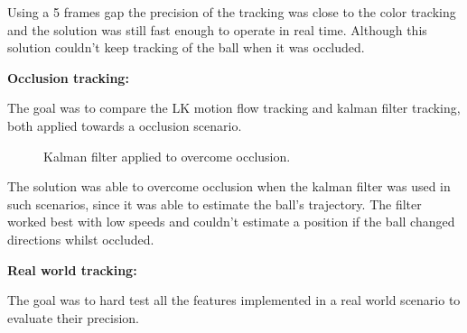 \documentclass[10pt,twocolumn,letterpaper]{article}
\begin{document}
  Using a 5 frames gap the precision of the tracking was close to the color
  tracking and the solution was still fast enough to operate in real time.
  Although this solution couldn't keep tracking of the ball when it was occluded.

  \bigbreak{}
  \textbf{Occlusion tracking:}
  \bigbreak{}

  The goal was to compare the LK motion flow tracking and kalman filter
  tracking, both applied towards a occlusion scenario.

  \begin{figure}[!h]
    \centering
    \setlength{\fboxsep}{1pt}
    \setlength{\fboxrule}{1pt}
    \caption{Kalman filter applied to overcome occlusion.}\label{fig:occlusion}
  \end{figure}

  The solution was able to overcome occlusion when the kalman filter was used in
  such scenarios, since it was able to estimate the ball's trajectory. The
  filter worked best with low speeds and couldn't estimate a position if the
  ball changed directions whilst occluded.

  \bigbreak{}
  \textbf{Real world tracking:}
  \bigbreak{}

  The goal was to hard test all the features implemented in a real world
  scenario to evaluate their precision.
\end{document}
